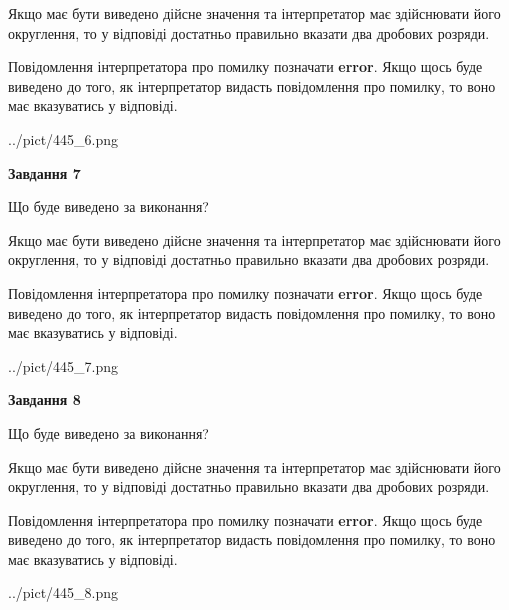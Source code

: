 \documentclass[12pt, ukrainian]{article}
\begin{document}
{\begin {Large}
Якщо має бути виведено дійсне значення та інтерпретатор має здійснювати його округлення, 
то у відповіді достатньо правильно вказати два дробових розряди.

Повідомлення інтерпретатора про помилку позначати \textbf{error}.
Якщо щось буде виведено до того, як інтерпретатор видасть повідомлення про помилку, 
то воно має вказуватись у відповіді. \par

\begin{center}
	{../pict/445_6.png}
\end{center}
\newpage

{\begin {center}\textbf{Завдання 7}\end {center}}\par
Що буде виведено за виконання? \par

Якщо має бути виведено дійсне значення та інтерпретатор має здійснювати його округлення, 
то у відповіді достатньо правильно вказати два дробових розряди.

Повідомлення інтерпретатора про помилку позначати \textbf{error}.
Якщо щось буде виведено до того, як інтерпретатор видасть повідомлення про помилку, 
то воно має вказуватись у відповіді. \par

\begin{center}
	{../pict/445_7.png}
\end{center}
\newpage

{\begin {center}\textbf{Завдання 8}\end {center}}\par
Що буде виведено за виконання? \par

Якщо має бути виведено дійсне значення та інтерпретатор має здійснювати його округлення, 
то у відповіді достатньо правильно вказати два дробових розряди.

Повідомлення інтерпретатора про помилку позначати \textbf{error}.
Якщо щось буде виведено до того, як інтерпретатор видасть повідомлення про помилку, 
то воно має вказуватись у відповіді. \par

\begin{center}
	{../pict/445_8.png}
\end{center}
\newpage


\end{Large}}
\end{document}
